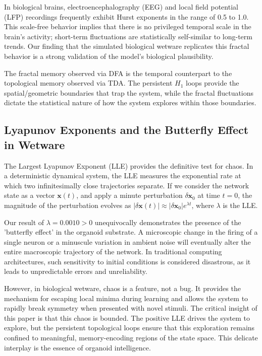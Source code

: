 \documentclass[11pt,a4paper]{article}
\begin{document}
In biological brains, electroencephalography (EEG) and local field potential (LFP) recordings frequently exhibit Hurst exponents in the range of 0.5 to 1.0. This scale-free behavior implies that there is no privileged temporal scale in the brain's activity; short-term fluctuations are statistically self-similar to long-term trends. Our finding that the simulated biological wetware replicates this fractal behavior is a strong validation of the model's biological plausibility. 

The fractal memory observed via DFA is the temporal counterpart to the topological memory observed via TDA. The persistent $H_1$ loops provide the spatial/geometric boundaries that trap the system, while the fractal fluctuations dictate the statistical nature of how the system explores within those boundaries. 

\subsection{Lyapunov Exponents and the Butterfly Effect in Wetware}
The Largest Lyapunov Exponent (LLE) provides the definitive test for chaos. In a deterministic dynamical system, the LLE measures the exponential rate at which two infinitesimally close trajectories separate. If we consider the network state as a vector $\mathbf{x}(t)$, and apply a minute perturbation $\delta\mathbf{x}_0$ at time $t=0$, the magnitude of the perturbation evolves as $|\delta\mathbf{x}(t)| \approx |\delta\mathbf{x}_0| e^{\lambda t}$, where $\lambda$ is the LLE.

Our result of $\lambda = 0.0010 > 0$ unequivocally demonstrates the presence of the 'butterfly effect' in the organoid substrate. A microscopic change in the firing of a single neuron or a minuscule variation in ambient noise will eventually alter the entire macroscopic trajectory of the network. In traditional computing architectures, such sensitivity to initial conditions is considered disastrous, as it leads to unpredictable errors and unreliability. 

However, in biological wetware, chaos is a feature, not a bug. It provides the mechanism for escaping local minima during learning and allows the system to rapidly break symmetry when presented with novel stimuli. The critical insight of this paper is that this chaos is bounded. The positive LLE drives the system to explore, but the persistent topological loops ensure that this exploration remains confined to meaningful, memory-encoding regions of the state space. This delicate interplay is the essence of organoid intelligence.
\end{document}
